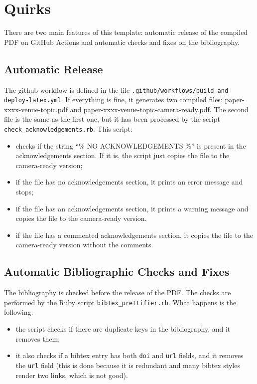 \documentclass[final,5pt,times,twocolumn]{elsarticle}
\begin{document}
    \section{Quirks}\label{sec:quirks}
        There are two main features of this template: automatic release of the compiled PDF on GitHub Actions and automatic checks and fixes on the bibliography.
        \subsection{Automatic Release}\label{subsec:automatic-release}
            The github workflow is defined in the file \texttt{.github/workflows/build-and-deploy-latex.yml}.
            If everything is fine, it generates two compiled files: paper-xxxx-venue-topic.pdf and paper-xxxx-venue-topic-camera-ready.pdf.
            The second file is the same as the first one, but it has been processed by the script \texttt{check\_acknowledgements.rb}.
            This script:
            \begin{itemize}
                \item checks if the string ``\% NO ACKNOWLEDGEMENTS \%'' is present in the acknowledgements section.
                If it is, the script just copies the file to the camera-ready version;
                \item if the file has no acknowledgements section, it prints an error message and stops;
                \item if the file has an acknowledgements section, it prints a warning message and copies the file to the camera-ready version.
                \item if the file has a commented acknowledgements section, it copies the file to the camera-ready version without the comments.
            \end{itemize}

        \subsection{Automatic Bibliographic Checks and Fixes}\label{subsec:automatic-checks-and-fixes-on-the-bibliography}
            The bibliography is checked before the release of the PDF.
            The checks are performed by the Ruby script \texttt{bibtex\_prettifier.rb}.
            What happens is the following:
            \begin{itemize}
                \item the script checks if there are duplicate keys in the bibliography, and it removes them;
                \item it also checks if a bibtex entry has both \texttt{doi} and \texttt{url} fields, and it removes the \texttt{url} field (this is done because it is redundant and many bibtex styles render two links, which is not good).
            \end{itemize}
\end{document}
